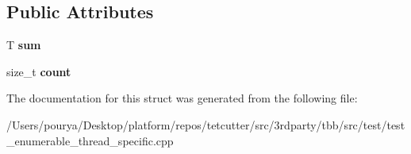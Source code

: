 \subsection*{Public Attributes}
\begin{DoxyCompactItemize}
\item 
\hypertarget{structparallel__vector__reduce__body_ae3d3a8f5234c7d81f9818620e04a5796}{}T {\bfseries sum}\label{structparallel__vector__reduce__body_ae3d3a8f5234c7d81f9818620e04a5796}

\item 
\hypertarget{structparallel__vector__reduce__body_a5cec48f52cd695b1ef535aa9e35cffe3}{}size\+\_\+t {\bfseries count}\label{structparallel__vector__reduce__body_a5cec48f52cd695b1ef535aa9e35cffe3}

\end{DoxyCompactItemize}


The documentation for this struct was generated from the following file\+:\begin{DoxyCompactItemize}
\item 
/\+Users/pourya/\+Desktop/platform/repos/tetcutter/src/3rdparty/tbb/src/test/test\+\_\+enumerable\+\_\+thread\+\_\+specific.\+cpp\end{DoxyCompactItemize}
